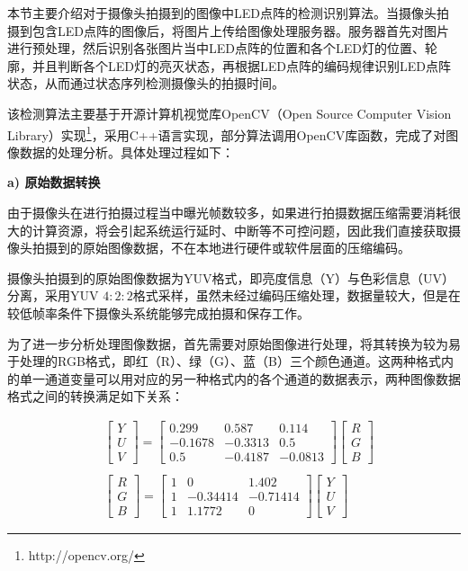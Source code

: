 本节主要介绍对于摄像头拍摄到的图像中LED点阵的检测识别算法。当摄像头拍摄到包含LED点阵的图像后，将图片上传给图像处理服务器。服务器首先对图片进行预处理，然后识别各张图片当中LED点阵的位置和各个LED灯的位置、轮廓，并且判断各个LED灯的亮灭状态，再根据LED点阵的编码规律识别LED点阵状态，从而通过状态序列检测摄像头的拍摄时间。

该检测算法主要基于开源计算机视觉库OpenCV（Open Source Computer Vision Library）实现\footnote{http://opencv.org/}，采用C++语言实现，部分算法调用OpenCV库函数，完成了对图像数据的处理分析。具体处理过程如下：

\textbf{a) 原始数据转换}

由于摄像头在进行拍摄过程当中曝光帧数较多，如果进行拍摄数据压缩需要消耗很大的计算资源，将会引起系统运行延时、中断等不可控问题，因此我们直接获取摄像头拍摄到的原始图像数据，不在本地进行硬件或软件层面的压缩编码。

摄像头拍摄到的原始图像数据为YUV格式，即亮度信息（Y）与色彩信息（UV）分离，采用YUV $4:2:2$格式采样，虽然未经过编码压缩处理，数据量较大，但是在较低帧率条件下摄像头系统能够完成拍摄和保存工作。

为了进一步分析处理图像数据，首先需要对原始图像进行处理，将其转换为较为易于处理的RGB格式，即红（R）、绿（G）、蓝（B）三个颜色通道。这两种格式内的单一通道变量可以用对应的另一种格式内的各个通道的数据表示，两种图像数据格式之间的转换满足如下关系\cite{rumball1992method}：

\begin{equation}
\begin{split}
& \left[
\begin{matrix}
Y \\
U \\
V
\end{matrix}
\right]
=
\left[
\begin{matrix}
0.299 & 0.587 & 0.114 \\
-0.1678 & -0.3313 & 0.5 \\
0.5 & -0.4187 & -0.0813
\end{matrix}
\right]
\left[
\begin{matrix}
R \\
G \\
B
\end{matrix}
\right] \\ \\
& \left[
\begin{matrix}
R \\
G \\
B
\end{matrix}
\right]
=
\left[
\begin{matrix}
1 & 0 & 1.402 \\
1 & -0.34414 & -0.71414 \\
1 & 1.1772 & 0
\end{matrix}
\right]
\left[
\begin{matrix}
Y \\
U \\
V
\end{matrix}
\right]
\end{split}
\label{rgb}
\end{equation}

